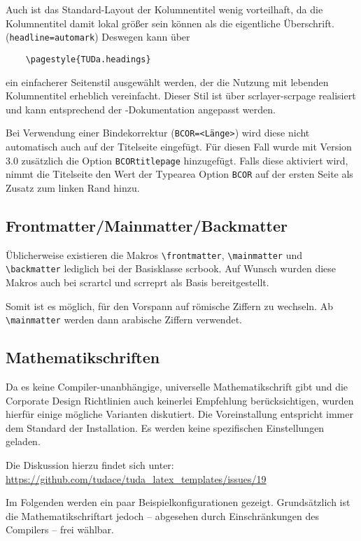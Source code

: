 \documentclass[
	german,
	accentcolor=9c,%
	]{tudapub}
\let\code\texttt
\let\pck\textsf
\let\cls\textsf
\begin{document}
Auch ist das Standard-Layout der Kolumnentitel wenig vorteilhaft, da die Kolumnentitel damit lokal größer sein können als die eigentliche Überschrift. (\code{headline=automark})
Deswegen kann über
\begin{verbatim}
	\pagestyle{TUDa.headings}
\end{verbatim}
ein einfacherer Seitenstil ausgewählt werden, der die Nutzung mit lebenden Kolumnentitel erheblich vereinfacht. Dieser Stil ist über \pck{scrlayer-scrpage} realisiert und kann entsprechend der \KOMAScript{}-Dokumentation angepasst werden.

Bei Verwendung einer Bindekorrektur (\code{BCOR=<Länge>}) wird diese nicht automatisch auch auf der Titelseite eingefügt. Für diesen Fall wurde mit Version 3.0 zusätzlich die Option \code{BCORtitlepage} hinzugefügt. Falls diese aktiviert wird, nimmt die Titelseite den Wert der Typearea Option \code{BCOR} auf der ersten Seite als Zusatz zum linken Rand hinzu.


\subsection{Frontmatter/Mainmatter/Backmatter}
Üblicherweise existieren die Makros \verb+\frontmatter+, \verb+\mainmatter+ und \verb+\backmatter+ lediglich bei der Basisklasse \cls{scrbook}.
Auf Wunsch wurden diese Makros auch bei \cls{scrartcl} und \cls{scrreprt} als Basis bereitgestellt.

Somit ist es möglich, für den Vorspann auf römische Ziffern zu wechseln. Ab \verb+\mainmatter+ werden dann arabische Ziffern verwendet.


\subsection{Mathematikschriften}
Da es keine Compiler-unanbhängige, universelle Mathematikschrift gibt und die Corporate Design Richtlinien auch keinerlei Empfehlung berücksichtigen, wurden hierfür einige mögliche Varianten diskutiert. Die Voreinstallung entspricht immer dem Standard der Installation. Es werden keine spezifischen Einstellungen geladen.

Die Diskussion hierzu findet sich unter:\\
\url{https://github.com/tudace/tuda_latex_templates/issues/19}

Im Folgenden werden ein paar Beispielkonfigurationen gezeigt. Grundsätzlich ist die Mathematikschriftart jedoch -- abgesehen durch Einschränkungen des Compilers -- frei wählbar.
\end{document}
